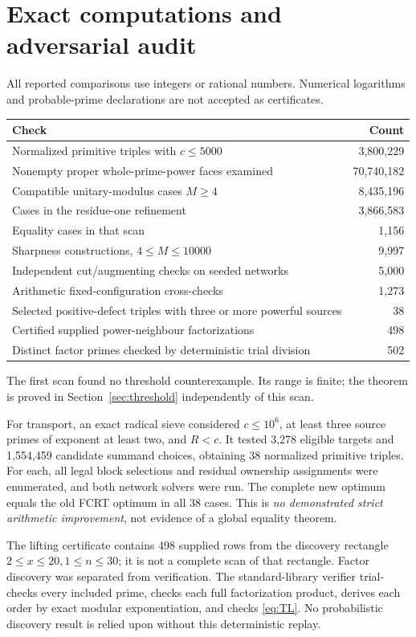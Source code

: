 \documentclass[11pt]{article}
\theoremstyle{definition}\newtheorem{definition}[theorem]{Definition}
\theoremstyle{remark}\newtheorem{remark}[theorem]{Remark}
\begin{document}
\section{Exact computations and adversarial audit}\label{sec:tests}
All reported comparisons use integers or rational numbers. Numerical logarithms and probable-prime declarations are not accepted as certificates.
\begin{center}\small
\begin{tabular}{p{91mm}r}\toprule
Check & Count\\\midrule
Normalized primitive triples with \(c\le5000\) & 3,800,229\\
Nonempty proper whole-prime-power faces examined & 70,740,182\\
Compatible unitary-modulus cases \(M\ge4\) & 8,435,196\\
Cases in the residue-one refinement & 3,866,583\\
Equality cases in that scan & 1,156\\
Sharpness constructions, \(4\le M\le10000\) & 9,997\\
Independent cut/augmenting checks on seeded networks & 5,000\\
Arithmetic fixed-configuration cross-checks & 1,273\\
Selected positive-defect triples with three or more powerful sources & 38\\
Certified supplied power-neighbour factorizations & 498\\
Distinct factor primes checked by deterministic trial division & 502\\\bottomrule
\end{tabular}
\end{center}
The first scan found no threshold counterexample. Its range is finite; the theorem is proved in Section~\ref{sec:threshold} independently of this scan.

For transport, an exact radical sieve considered \(c\le10^6\), at least three source primes of exponent at least two, and \(R<c\). It tested 3,278 eligible targets and 1,554,459 candidate summand choices, obtaining 38 normalized primitive triples. For each, all legal block selections and residual ownership assignments were enumerated, and both network solvers were run. The complete new optimum equals the old FCRT optimum in all 38 cases. This is \emph{no demonstrated strict arithmetic improvement}, not evidence of a global equality theorem.

The lifting certificate contains 498 supplied rows from the discovery rectangle \(2\le x\le20,1\le n\le30\); it is not a complete scan of that rectangle. Factor discovery was separated from verification. The standard-library verifier trial-checks every included prime, checks each full factorization product, derives each order by exact modular exponentiation, and checks \eqref{eq:TL}. No probabilistic discovery result is relied upon without this deterministic replay.
\end{document}

